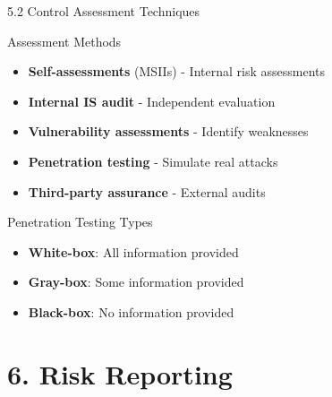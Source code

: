 \documentclass{beamer}
\begin{document}
	\begin{frame}{5.2 Control Assessment Techniques}
		\begin{block}{Assessment Methods}
			\begin{itemize}
				\item \textbf{Self-assessments} (MSIIs) - Internal risk assessments
				\item \textbf{Internal IS audit} - Independent evaluation
				\item \textbf{Vulnerability assessments} - Identify weaknesses
				\item \textbf{Penetration testing} - Simulate real attacks
				\item \textbf{Third-party assurance} - External audits
			\end{itemize}
		\end{block}
		
		\begin{block}{Penetration Testing Types}
			\begin{itemize}
				\item \textbf{White-box}: All information provided
				\item \textbf{Gray-box}: Some information provided
				\item \textbf{Black-box}: No information provided
			\end{itemize}
		\end{block}
	\end{frame}
	
	\section{6. Risk Reporting}
	
\end{document}
